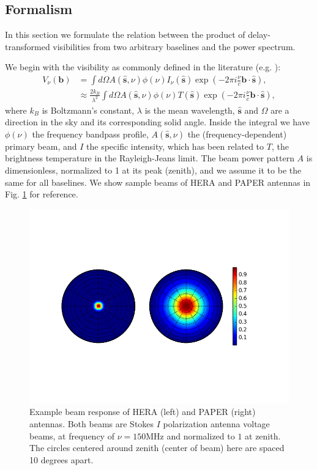 \documentclass[twocolumn,apj,numberedappendix]{emulateapj}
\renewcommand\[{\begin{equation}}
\renewcommand\]{\end{equation}}
\begin{document}
\subsection{Formalism}
\label{sec:formalism}
In this section we formulate the relation between 
the product of delay-transformed visibilities from two arbitrary baselines and the power spectrum. 

We begin with the visibility as commonly defined in the literature (e.g.
\citealt{TMS, first-paper}): 
\begin{equation}
\begin{aligned}V_{\nu}(\boldsymbol{b}) & =\int d\Omega A(\hat{\boldsymbol{s}},\nu)\phi(\nu)I_{\nu}(\hat{\boldsymbol{s}})\exp\left(-2\pi i\frac{\nu}{c}\boldsymbol{b}\cdot\hat{\boldsymbol{s}}\right),\\
 & \approx\frac{2k_{B}}{\lambda^{2}}\int d\Omega A(\hat{\boldsymbol{s}},\nu)\phi(\nu)T(\hat{\boldsymbol{s}})\exp\left(-2\pi i\frac{\nu}{c}\boldsymbol{b}\cdot\hat{\boldsymbol{s}}\right),
\end{aligned}
\label{eq:Vis1}
\end{equation}
where $k_B$ is Boltzmann's constant, $\lambda$ is the mean wavelength, $\hat{\boldsymbol{s}}$ and $\Omega$ are a direction in the
sky and its corresponding solid angle. Inside the integral we have $\phi(\nu)$ the frequency bandpass profile, $A(\hat{\boldsymbol{s}},\nu)$ the (frequency-dependent) primary beam, and $I$ the specific intensity, which has been
related to $T$, the brightness temperature in the Rayleigh-Jeans
limit. The beam power pattern $A$ is dimensionless,
normalized to 1 at its peak (zenith), and we assume it to be the same
for all baselines. We show sample beams of HERA and PAPER antennas in Fig. \ref{fig:Beam} for reference. 



\begin{figure}[H]
\includegraphics[width=1.2\linewidth]{Beams}

\caption{Example beam response of HERA (left) and PAPER (right) antennas. Both beams are Stokes $I$ polarization antenna voltage beams, at frequency of $\nu=150\text{MHz}$ and normalized to $1$ at zenith. The circles centered around zenith (center of beam) here are
spaced 10 degrees apart. \label{fig:Beam}}
\end{figure}
\end{document}
